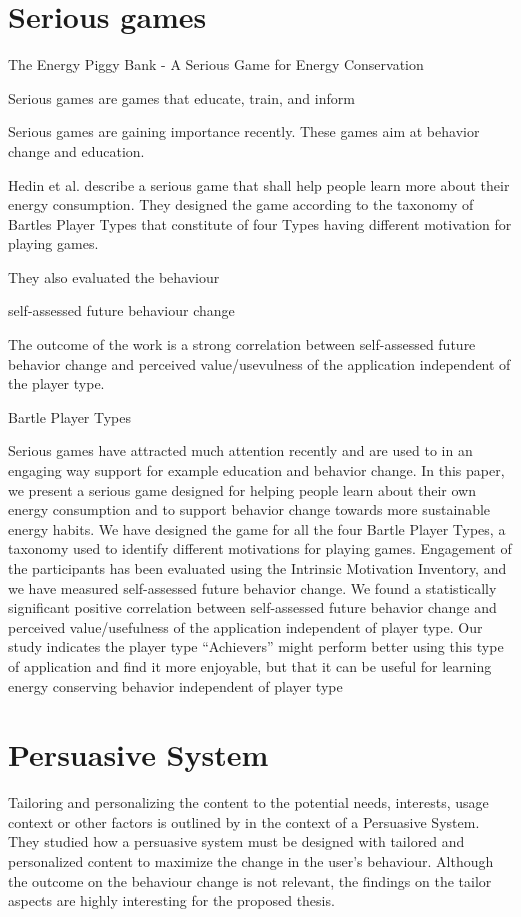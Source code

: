 \cite{jeon2008user}

\section{Serious games}

The Energy Piggy Bank - A Serious Game for Energy Conservation

Serious games are games that educate, train, and inform

Serious games are gaining importance recently. These games aim at behavior change and education.

Hedin et al. \cite{Bjorn1165339} describe a serious game that shall help people learn more about their energy consumption. They designed the game according to the taxonomy of Bartles Player Types that constitute of four Types having different motivation for playing games.


They also evaluated the behaviour 

self-assessed future behaviour change 

The outcome of the work is a strong correlation between self-assessed future behavior change and perceived value/usevulness of the application independent of the player type.

Bartle Player Types

Serious games have attracted much attention recently and are used to in an engaging way support for example education and behavior change. In this paper, we present a serious game designed for helping people learn about their own energy consumption and to support behavior change towards more sustainable energy habits. We have designed the game for all the four Bartle Player Types, a taxonomy used to identify different motivations for playing games. Engagement of the participants has been evaluated using the Intrinsic Motivation Inventory, and we have measured self-assessed future behavior change. We found a statistically significant positive correlation between self-assessed future behavior change and perceived value/usefulness of the application independent of player type. Our study indicates the player type “Achievers” might perform better using this type of application and find it more enjoyable, but that it can be useful for learning energy conserving behavior independent of player type


\section{Persuasive System}
Tailoring and personalizing the content to the potential needs, interests, usage context or other factors is outlined by \cite{oinas2009persuasive} in the context of a Persuasive System. They studied how a persuasive system must be designed with tailored and personalized content to maximize the change in the user's behaviour. Although the outcome on the behaviour change is not relevant, the findings on the tailor aspects are highly interesting for the proposed thesis.




